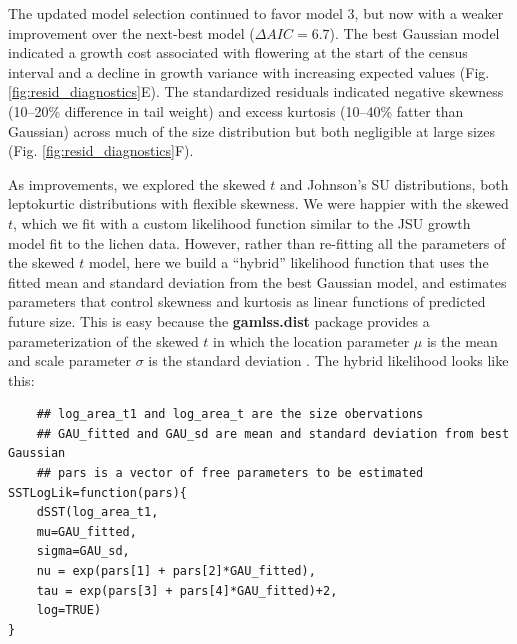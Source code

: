 \documentclass[12pt]{article}
\begin{document}
The updated model selection continued to favor model 3, but now with a weaker improvement over the next-best model ($\Delta AIC = 6.7$). 
The best Gaussian model indicated a growth cost associated with flowering at the start of the census interval and a decline in growth variance with increasing expected values (Fig. \ref{fig:resid_diagnostics}E). 
The standardized residuals indicated negative skewness (10--20\% difference in tail weight) and excess kurtosis (10--40\% fatter than Gaussian) across much of the size distribution but both negligible at large sizes (Fig. \ref{fig:resid_diagnostics}F). 

As improvements, we explored the skewed $t$ and Johnson's SU distributions, both leptokurtic distributions with flexible skewness. 
We were happier with the skewed $t$, which we fit with a custom likelihood function similar to the JSU growth model fit to the lichen data. 
However, rather than re-fitting all the parameters of the skewed $t$ model, here we build a ``hybrid'' likelihood function that uses the fitted mean and standard deviation from the best Gaussian model, and estimates parameters that control skewness and kurtosis as linear functions of predicted future size. 
This is easy because the \textbf{gamlss.dist} package provides a parameterization of the skewed $t$ in which the location parameter $\mu$ is the mean and scale parameter $\sigma$ is the standard deviation \citep{rigby2019distributions}. 
The hybrid likelihood looks like this:
\begin{lstlisting}
	## log_area_t1 and log_area_t are the size obervations
	## GAU_fitted and GAU_sd are mean and standard deviation from best Gaussian
	## pars is a vector of free parameters to be estimated
SSTLogLik=function(pars){
	dSST(log_area_t1, 
	mu=GAU_fitted,
	sigma=GAU_sd,
	nu = exp(pars[1] + pars[2]*GAU_fitted),
	tau = exp(pars[3] + pars[4]*GAU_fitted)+2, 
	log=TRUE)
}
\end{lstlisting}
\end{document}

